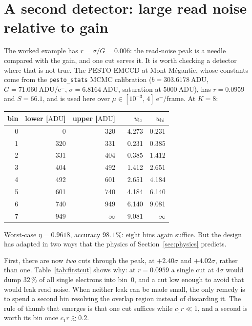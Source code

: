 \documentclass[11pt,a4paper]{article}
\newcommand{\ADU}{\ensuremath{\mathrm{ADU}}}
\newcommand{\eminus}{\ensuremath{\mathrm{e}^-}}
\begin{document}
\section{A second detector: large read noise relative to gain}
\label{sec:pesto}

The worked example has $r = \sigma/G = 0.006$: the read-noise peak is a
needle compared with the gain, and one cut serves it. It is worth checking a
detector where that is not true. The PESTO EMCCD at Mont-M\'egantic, whose
constants come from the \texttt{pesto\_stats} MCMC calibration
($b = 303.6178\ \ADU$, $G = 71.060\ \ADU/\eminus$, $\sigma = 6.8164\ \ADU$,
saturation at $5000\ \ADU$), has $r = 0.0959$ and $S = 66.1$, and is used here
over $\mu \in [10^{-3},\,4]\ \eminus$/frame. At $K = 8$:

\begin{center}
\small
\begin{tabular}{rrrrr}
\toprule
bin & lower [\ADU] & upper [\ADU] & $u_{\rm lo}$ & $u_{\rm hi}$\\
\midrule
0 &   0 & 320 & $-4.273$ & 0.231\\
1 & 320 & 331 &  0.231 & 0.385\\
2 & 331 & 404 &  0.385 & 1.412\\
3 & 404 & 492 &  1.412 & 2.651\\
4 & 492 & 601 &  2.651 & 4.184\\
5 & 601 & 740 &  4.184 & 6.140\\
6 & 740 & 949 &  6.140 & 9.081\\
7 & 949 & $\infty$ & 9.081 & $\infty$\\
\bottomrule
\end{tabular}
\end{center}

Worst-case $\eta = 0.9618$, accuracy $98.1\,\%$: eight bins again suffice. But
the design has adapted in two ways that the physics of
Section~\ref{sec:physics} predicts.

First, there are now \emph{two} cuts through the peak, at $+2.40\sigma$ and
$+4.02\sigma$, rather than one. Table~\ref{tab:firstcut} shows why: at
$r = 0.0959$ a single cut at $4\sigma$ would dump $32\,\%$ of all single
electrons into bin~0, and a cut low enough to avoid that would leak read noise.
When neither leak can be made small, the only remedy is to spend a second bin
resolving the overlap region instead of discarding it. The rule of thumb that
emerges is that one cut suffices while $c_1 r \ll 1$, and a second is worth its
bin once $c_1 r \gtrsim 0.2$.
\end{document}
